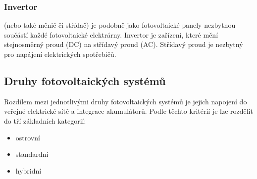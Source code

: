 



\subsubsection{Invertor}

(nebo také měnič či střídač) je podobně jako fotovoltaické panely
nezbytnou součástí každé fotovoltaické elektrárny.
Invertor je zařízení, které mění stejnosměrný proud (DC) na střídavý proud (AC).
Střídavý proud je nezbytný pro napájení elektrických spotřebičů.



\subsection{Druhy fotovoltaických systémů}

Rozdílem mezi jednotlivými druhy fotovoltaických systémů je jejich napojení do veřejné elektrické sítě a integrace akumulátorů.
Podle těchto kritérií je lze rozdělit do tří základních kategorií:

\begin{itemize}
    \item ostrovní
    \item standardní
    \item hybridní
\end{itemize}

